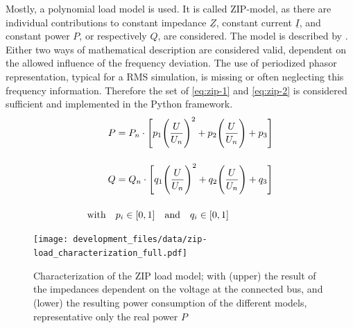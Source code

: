 Mostly, a polynomial load model is used. It is called ZIP-model, as there are individual contributions to constant impedance $\underline{Z}$, constant current $\underline{I}$, and constant power $P$, or respectively $Q$, are considered. The model is described by \textcite{IEEEGuideLoad2022}. Either two ways of mathematical description are considered valid, dependent on the allowed influence of the frequency deviation. The use of periodized phasor representation, typical for a \acs{RMS} simulation, is missing or often neglecting this frequency information. Therefore the set of \autoref{eq:zip-1} and \autoref{eq:zip-2} is considered sufficient and implemented in the Python framework.
\begin{align}
        P&=P_n \cdot \Bigg[ p_1 \Bigg(\frac{U}{U_n}\Bigg)^2 + p_2 \Bigg(\frac{U}{U_n}\Bigg) + p_3 \Bigg] \label{eq:zip-1} \\[12pt]
        Q&=Q_n \cdot \Bigg[ q_1 \Bigg(\frac{U}{U_n}\Bigg)^2 + q_2 \Bigg(\frac{U}{U_n}\Bigg) + q_3 \Bigg] \label{eq:zip-2} \\[12pt]
        \text{with} \quad &p_i \in [0,1] \quad \text{and} \quad q_i \in [0,1] \notag
\end{align}


\begin{figure}[htb!]
        \centering
        \texttt{[image: development\_files/data/zip-load\_characterization\_full.pdf]}
        \caption[Characterization of the ZIP load model]{Characterization of the ZIP load model; with (upper) the result of the impedances dependent on the voltage at the connected bus, and (lower) the resulting power consumption of the different models, representative only the real power $P$}
        \label{fig:zip-charac}
\end{figure}

